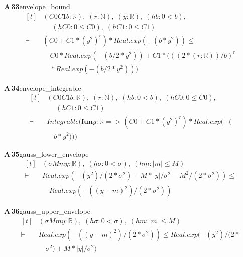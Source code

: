 \documentclass[conference]{IEEEtran}
\theoremstyle{definition}
\newcommand{\lean}[1]{\textsf{\footnotesize #1}}
\begin{document}
\noindent\textbf{A\,33}\quad\lean{envelope\_bound}
{\footnotesize\[ \begin{aligned}[t]
&(\mathit{C0} \mathit{C1} \mathit{b} : \mathbb{R} ),\; (\mathit{r} : \mathbb{N} ),\; (\mathit{y} : \mathbb{R} ),\; (\mathit{hb} : 0 < \mathit{b}),\\
&\quad \; (\mathit{hC0} : 0 \leq \mathit{C0}),\; (\mathit{hC1} : 0 \leq \mathit{C1})\\
\vdash\;&(\mathit{C0} + \mathit{C1} * (\mathit{y} ^{2}) ^{\mathit{r}}) * \mathit{Real}.\mathit{exp} (-(\mathit{b} * \mathit{y} ^{2})) \leq\\
&\quad \mathit{C0} * \mathit{Real}.\mathit{exp} (-(\mathit{b} / 2 * \mathit{y} ^{2})) + \mathit{C1} * (((2 * (\mathit{r} : \mathbb{R} )) / \mathit{b}) ^{\mathit{r}}\\
&\quad * \mathit{Real}.\mathit{exp} (-(\mathit{b} / 2 * \mathit{y} ^{2})))
\end{aligned} \]}

\noindent\textbf{A\,34}\quad\lean{envelope\_integrable}
{\footnotesize\[ \begin{aligned}[t]
&(\mathit{C0} \mathit{C1} \mathit{b} : \mathbb{R} ),\; (\mathit{r} : \mathbb{N} ),\; (\mathit{hb} : 0 < \mathit{b}),\; (\mathit{hC0} : 0 \leq \mathit{C0}),\\
&\quad \; (\mathit{hC1} : 0 \leq \mathit{C1})\\
\vdash\;&\mathit{Integrable} (\mathbf{fun} \mathit{y} : \mathbb{R} => (\mathit{C0} + \mathit{C1} * (\mathit{y} ^{2}) ^{\mathit{r}}) * \mathit{Real}.\mathit{exp} (-(\\
&\quad \mathit{b} * \mathit{y} ^{2})))
\end{aligned} \]}

\noindent\textbf{A\,35}\quad\lean{gauss\_lower\_envelope}
{\footnotesize\[ \begin{aligned}[t]
&(\sigma \mathit{M} \mathit{m} \mathit{y} : \mathbb{R} ),\; (\mathit{hσ} : 0 < \sigma ),\; (\mathit{hm} : |\mathit{m}| \leq \mathit{M})\\
\vdash\;&\mathit{Real}.\mathit{exp} (-(\mathit{y} ^{2}) / (2 * \sigma ^{2}) - \mathit{M} * |\mathit{y}| / \sigma ^{2} - \mathit{M} ^{2} / (2 * \sigma ^{2})) \leq\\
&\quad \mathit{Real}.\mathit{exp} (-((\mathit{y} - \mathit{m}) ^{2}) / (2 * \sigma ^{2}))
\end{aligned} \]}

\noindent\textbf{A\,36}\quad\lean{gauss\_upper\_envelope}
{\footnotesize\[ \begin{aligned}[t]
&(\sigma \mathit{M} \mathit{m} \mathit{y} : \mathbb{R} ),\; (\mathit{hσ} : 0 < \sigma ),\; (\mathit{hm} : |\mathit{m}| \leq \mathit{M})\\
\vdash\;&\mathit{Real}.\mathit{exp} (-((\mathit{y} - \mathit{m}) ^{2}) / (2 * \sigma ^{2})) \leq \mathit{Real}.\mathit{exp} (-(\mathit{y} ^{2}) / (2 *\\
&\quad \sigma ^{2}) + \mathit{M} * |\mathit{y}| / \sigma ^{2})
\end{aligned} \]}
\end{document}
